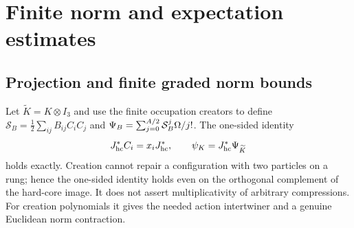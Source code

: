 \section{Finite norm and expectation estimates}\label{sec:moments}
\subsection{Projection and finite graded norm bounds}
Let $\widetilde K=K\otimes I_3$ and use the finite occupation creators to define
$\mathcal S_B=\tfrac12\sum_{ij}B_{ij}C_iC_j$ and
$\Psi_B=\sum_{j=0}^{A/2}\mathcal S_B^j\Omega/j!$.
The one-sided identity
\begin{equation}\label{eq:projection}
 J_{\rm hc}^*C_i=x_iJ_{\rm hc}^*,\qquad
 \psi_K=J_{\rm hc}^*\Psi_{\widetilde K}
\end{equation}
holds exactly. Creation cannot repair a configuration with two particles on a
rung; hence the one-sided identity holds even on the orthogonal complement of
the hard-core image. It does not assert multiplicativity of arbitrary
compressions. For creation polynomials it gives the needed action intertwiner
and a genuine Euclidean norm contraction.

